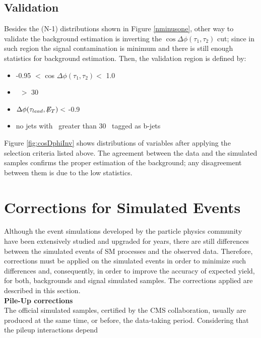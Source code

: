 \subsection{Validation}
\label{subsec:Validation}

\noindent Besides the (N-1) distributions shown in Figure \ref{nminusone},
other way to validate the background estimation is inverting the 
$\cos \Delta \phi (\tau_{1},\tau_{2})$ cut; since in such region 
the signal contamination is minimum and there is still enough statistics 
for background estimation. Then, the validation 
region is defined by:

\begin{itemize}
 \item -0.95 $<$ cos $\Delta \phi (\tau_{1},\tau_{2}) <$ 1.0
 \item \MET~$>$ 30 \GeV
 \item $\Delta \phi (\tau_{lead}, \not\!\!E_T) <$ -0.9
 \item no jets with \pt~greater than 30 \GeV~tagged as b-jets
\end{itemize}

\noindent Figure \ref{fig:cosDphiInv} shows distributions of variables after applying
the selection criteria listed above. The agreement between the data and the simulated
samples confirms the proper estimation of the background; any disagreement
between them is due to the low statistics.

\section{Corrections for Simulated Events}
\label{sec:PUCorrection}

\noindent Although the event simulations developed by the particle physics
community have been extensively studied and upgraded for years, there are still
differences between the simulated events of SM processes and the observed 
data. Therefore, corrections must be applied on the simulated events
in order to minimize such differences and, consequently, in order
to improve the accuracy of expected yield, for both, backgrounds and 
signal simulated samples. The corrections applied are 
described in this section.\\

\textbf{Pile-Up corrections} \\

\noindent The official simulated samples, certified by the CMS collaboration, usually 
are produced at the same time, or before, the data-taking period. Considering 
that the pileup interactions depend

